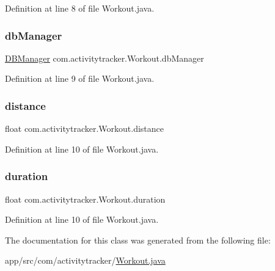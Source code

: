 Definition at line 8 of file Workout.\+java.

\mbox{\label{classcom_1_1activitytracker_1_1_workout_a992aa5129fbae42bc1e18273826631e2}} 
\subsubsection{\texorpdfstring{db\+Manager}{dbManager}}
{\footnotesize\ttfamily \mbox{\hyperlink{classcom_1_1activitytracker_1_1_d_b_manager}{D\+B\+Manager}} com.\+activitytracker.\+Workout.\+db\+Manager\hspace{0.3cm}{\ttfamily [package]}}



Definition at line 9 of file Workout.\+java.

\mbox{\label{classcom_1_1activitytracker_1_1_workout_a3c90aaba800c15e1a487af2ff5623c63}} 
\subsubsection{\texorpdfstring{distance}{distance}}
{\footnotesize\ttfamily float com.\+activitytracker.\+Workout.\+distance\hspace{0.3cm}{\ttfamily [package]}}



Definition at line 10 of file Workout.\+java.

\mbox{\label{classcom_1_1activitytracker_1_1_workout_ad21c7ace0611f0159d087d68ad950b8e}} 
\subsubsection{\texorpdfstring{duration}{duration}}
{\footnotesize\ttfamily float com.\+activitytracker.\+Workout.\+duration\hspace{0.3cm}{\ttfamily [package]}}



Definition at line 10 of file Workout.\+java.



The documentation for this class was generated from the following file\+:\begin{DoxyCompactItemize}
\item 
app/src/com/activitytracker/\mbox{\hyperlink{_workout_8java}{Workout.\+java}}\end{DoxyCompactItemize}
